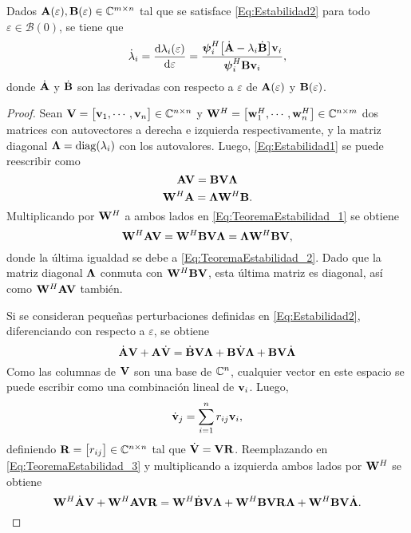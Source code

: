 		\begin{theorem}\label{Th:Estabilidad_Autovalores}
			Dados $\mathbf{A}(\varepsilon),\mathbf{B}(\varepsilon)\in\mathbb{C}^{m\times n}$ tal que se satisface \eqref{Eq:Estabilidad2} para todo $\varepsilon\in\mathcal{B}(0)$, se tiene que
			\begin{equation}
				\dot{\lambda}_i = \frac{\mathrm{d}\lambda_i(\varepsilon)}{\mathrm{d}\varepsilon} = \frac{\boldsymbol{\psi}_i^H\big[\dot{\mathbf{A}}-\lambda_i\dot{\mathbf{B}}\big]\mathbf{v}_i}{\boldsymbol{\psi}_i^H\mathbf{B}\mathbf{v}_i},
				\label{Eq:Eigenvalue_derivative}
			\end{equation} 
			donde $\dot{\mathbf{A}}$ y $\dot{\mathbf{B}}$ son las derivadas con respecto a $\varepsilon$ de $\mathbf{A}(\varepsilon)$ y $\mathbf{B}(\varepsilon)$.
		\end{theorem}
		\begin{proof}
			Sean $\mathbf{V} = \big[\mathbf{v}_1,\cdots,\mathbf{v}_n\big]\in\mathbb{C}^{n\times n}$ y $\mathbf{W}^H = \big[\mathbf{w}_1^H,\cdots,\mathbf{w}_n^H\big]\in\mathbb{C}^{n\times m}$ dos matrices con autovectores a derecha e izquierda respectivamente, y la matriz diagonal $\boldsymbol{\Lambda} = \mathrm{diag}(\lambda_i)$ con los autovalores. Luego, \eqref{Eq:Estabilidad1} se puede reescribir como
			\begin{equation}
				\mathbf{A}\mathbf{V} = \mathbf{B}\mathbf{V}\boldsymbol{\Lambda}
				\label{Eq:TeoremaEstabilidad_1}
			\end{equation}
			\begin{equation}
				\mathbf{W}^H\mathbf{A} = \boldsymbol{\Lambda}\mathbf{W}^H\mathbf{B}.
				\label{Eq:TeoremaEstabilidad_2}
			\end{equation}
			Multiplicando por $\mathbf{W}^H$ a ambos lados en \eqref{Eq:TeoremaEstabilidad_1} se obtiene
			\[\mathbf{W}^H\mathbf{A}\mathbf{V} = \mathbf{W}^H\mathbf{B}\mathbf{V}\boldsymbol{\Lambda} = \boldsymbol{\Lambda}\mathbf{W}^H\mathbf{B}\mathbf{V},\]
			donde la última igualdad se debe a \eqref{Eq:TeoremaEstabilidad_2}. Dado que la matriz diagonal $\boldsymbol{\Lambda}$ conmuta con $\mathbf{W}^H\mathbf{B}\mathbf{V}$, esta última matriz es diagonal, así como $\mathbf{W}^H\mathbf{A}\mathbf{V}$ también.
		
			Si se consideran pequeñas perturbaciones definidas en \eqref{Eq:Estabilidad2}, diferenciando con respecto a $\varepsilon$, se obtiene
			\begin{equation}
				\dot{\mathbf{A}}\mathbf{V} + \mathbf{A}\dot{\mathbf{V}} = \dot{\mathbf{B}}\mathbf{V}\boldsymbol{\Lambda} + \mathbf{B}\dot{\mathbf{V}}\boldsymbol{\Lambda} + \mathbf{B}\mathbf{V}\dot{\boldsymbol{\Lambda}}
				\label{Eq:TeoremaEstabilidad_3}
			\end{equation}
			Como las columnas de $\mathbf{V}$ son una base de $\mathbb{C}^n$, cualquier vector en este espacio se puede escribir como una combinación lineal de $\mathbf{v}_i$. Luego,
			\[\dot{\mathbf{v}}_j = \sum_{i=1}^n r_{ij}\mathbf{v}_i,\]
			definiendo $\mathbf{R} = \big[r_{ij}\big]\in\mathbb{C}^{n\times n}$ tal que $\dot{\mathbf{V}} = \mathbf{V}\mathbf{R}$. Reemplazando en \eqref{Eq:TeoremaEstabilidad_3} y multiplicando a izquierda ambos lados por $\mathbf{W}^H$ se obtiene
			\begin{equation}
				\mathbf{W}^H\dot{\mathbf{A}}\mathbf{V} + \mathbf{W}^H\mathbf{A}\mathbf{V}\mathbf{R} = \mathbf{W}^H\dot{\mathbf{B}}\mathbf{V}\boldsymbol{\Lambda} + \mathbf{W}^H\mathbf{B}\mathbf{V}\mathbf{R}\boldsymbol{\Lambda} + \mathbf{W}^H\mathbf{B}\mathbf{V}\dot{\boldsymbol{\Lambda}}.
				\label{Eq:TeoremaEstabilidad_4}
			\end{equation}
		

\end{proof}
